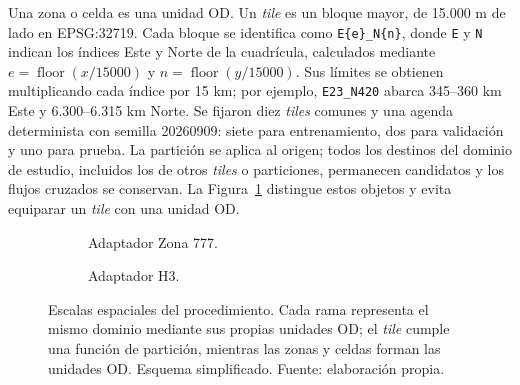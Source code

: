 Una zona o celda es una unidad OD. Un \textit{tile} es un bloque mayor, de 15.000 m de lado en EPSG:32719. Cada bloque se identifica como \texttt{E\{e\}\_N\{n\}}, donde \texttt{E} y \texttt{N} indican los índices Este y Norte de la cuadrícula, calculados mediante $e=\operatorname{floor}(x/15000)$ y $n=\operatorname{floor}(y/15000)$. Sus límites se obtienen multiplicando cada índice por 15 km; por ejemplo, \texttt{E23\_N420} abarca 345--360 km Este y 6.300--6.315 km Norte. Se fijaron diez \textit{tiles} comunes y una agenda determinista con semilla 20260909: siete para entrenamiento, dos para validación y uno para prueba. La partición se aplica al origen; todos los destinos del dominio de estudio, incluidos los de otros \textit{tiles} o particiones, permanecen candidatos y los flujos cruzados se conservan. La Figura~\ref{fig:objetos_espaciales} distingue estos objetos y evita equiparar un \textit{tile} con una unidad OD.

\begin{figure}[H]
\centering
\begin{subfigure}[t]{0.52\textwidth}
\centering
{}
\caption{Adaptador Zona 777.}
\end{subfigure}
\hfill
\begin{subfigure}[t]{0.47\textwidth}
\centering
{}
\caption{Adaptador H3.}
\end{subfigure}
\caption{Escalas espaciales del procedimiento. Cada rama representa el mismo dominio mediante sus propias unidades OD; el \textit{tile} cumple una función de partición, mientras las zonas y celdas forman las unidades OD. Esquema simplificado. Fuente: elaboración propia.}
\label{fig:objetos_espaciales}
\end{figure}

